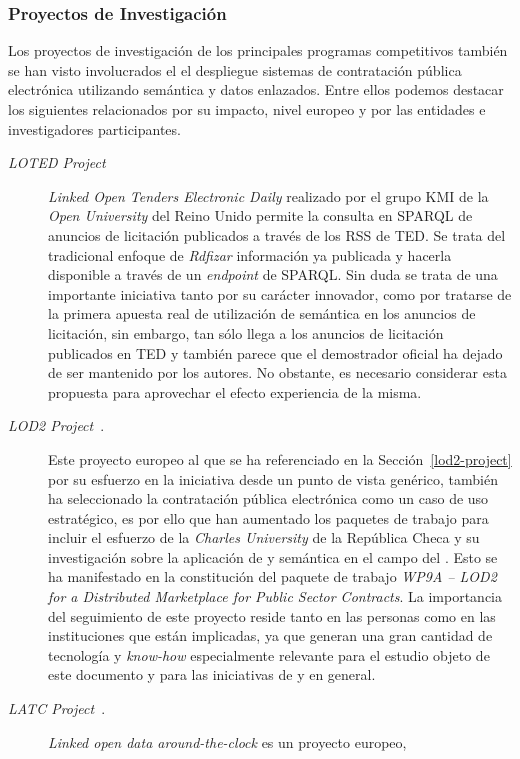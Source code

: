 \subsubsection{Proyectos de Investigación}
Los proyectos de investigación de los principales programas competitivos
también se han visto involucrados el el despliegue sistemas de contratación
pública electrónica utilizando semántica y datos enlazados. Entre ellos
podemos destacar los siguientes relacionados por su impacto, nivel europeo y por 
las entidades e investigadores participantes.
\begin{description}
 \item [\textit{LOTED Project}~\cite{loted-project}] \textit{Linked Open Tenders Electronic Daily} realizado
por el grupo KMI de la \textit{Open University} del Reino Unido permite la consulta en \gls{SPARQL} de anuncios de licitación
publicados a través de los \gls{RSS} de \gls{TED}. Se trata del tradicional enfoque de \textit{Rdfizar} información
ya publicada y hacerla disponible a través de un \textit{endpoint} de SPARQL. Sin duda se trata
de una importante iniciativa tanto por su carácter innovador, como por tratarse de la primera apuesta
real de utilización de semántica en los anuncios de licitación, sin embargo, tan sólo llega a los anuncios
de licitación publicados en TED y también parece que el demostrador oficial ha dejado de ser 
mantenido por los autores. No obstante, es necesario considerar esta propuesta para aprovechar
el efecto experiencia de la misma.
 \item [\textit{LOD2 Project}~\cite{lod2-project}.] Este proyecto europeo al que se ha referenciado en la
Sección~\ref{lod2-project} por su esfuerzo en la iniciativa \linkeddata desde un punto de vista genérico, también ha seleccionado la contratación pública electrónica como un caso de uso estratégico, es por ello
que han aumentado los paquetes de trabajo para incluir el esfuerzo de la \textit{Charles University} de la República Checa y su investigación sobre la aplicación de \linkeddata y semántica en el campo
del \eproc. Esto se ha manifestado en la constitución del paquete de trabajo \textit{WP9A – LOD2 for a Distributed Marketplace for Public Sector Contracts}.
La importancia del seguimiento de este proyecto reside tanto en las personas como en las instituciones que están implicadas, ya que generan 
una gran cantidad de tecnología y \textit{know-how} especialmente relevante para el estudio objeto de este documento y para las iniciativas
de \linkeddata y \opendata en general.
 \item [\textit{LATC Project}~\cite{latc-project}.] \textit{Linked open data around-the-clock} es un proyecto europeo,

\end{description}
